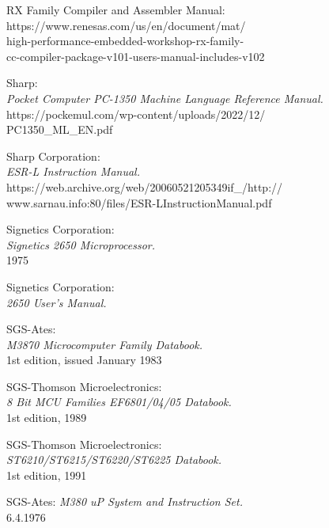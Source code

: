  RX Family Compiler and Assembler Manual: \\
                 https://www.renesas.com/us/en/document/mat/ \\
                 high-performance-embedded-workshop-rx-family-\\
                 cc-compiler-package-v101-users-manual-includes-v102

 Sharp: \\
                 {\em Pocket Computer PC-1350 Machine Language Reference Manual.} \\
                 https://pockemul.com/wp-content/uploads/2022/12/ \\
                 PC1350\_ML\_EN.pdf

 Sharp Corporation: \\
                 {\em ESR-L Instruction Manual.} \\
                 https://web.archive.org/web/20060521205349if\_/http:// \\
                 www.sarnau.info:80/files/ESR-LInstructionManual.pdf

 Signetics Corporation: \\
                 {\em Signetics 2650 Microprocessor.} \\
                 1975

 Signetics Corporation: \\
                 {\em 2650 User's Manual.}

 SGS-Ates: \\
                 {\em M3870 Microcomputer Family Databook.\/}\\
                 1st edition, issued January 1983

 SGS-Thomson Microelectronics: \\
                {\em 8 Bit MCU Families EF6801/04/05 Databook.\/}\\
                1st edition, 1989

 SGS-Thomson Microelectronics: \\
                {\em ST6210/ST6215/ST6220/ST6225 Databook.\/} \\
                1st edition, 1991

 SGS-Ates:
                {\em M380 uP System and Instruction Set.\/} \\
                6.4.1976

